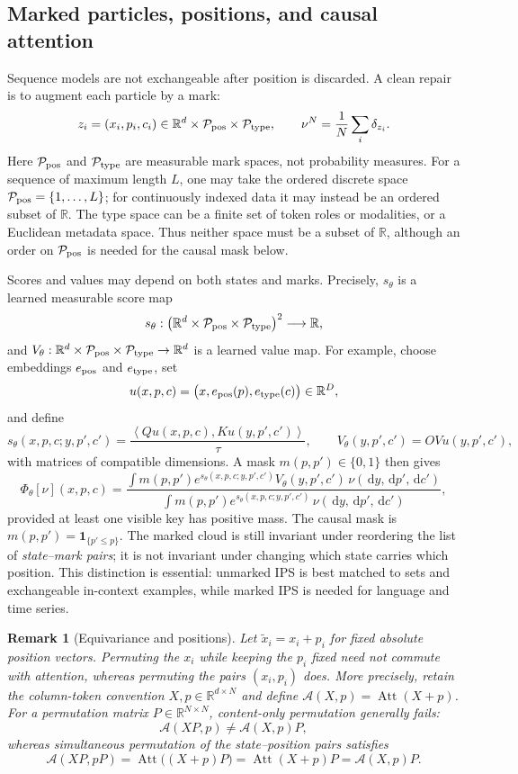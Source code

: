 \documentclass[11pt]{amsart}
\numberwithin{equation}{section}
\theoremstyle{plain}
\newtheorem{remark}[theorem]{Remark}
\newcommand{\R}{\mathbb{R}}
\newcommand{\dd}{\,\mathrm{d}}
\newcommand{\ip}[2]{\left\langle#1,#2\right\rangle}
\newcommand{\one}{\mathbf{1}}
\begin{document}
\subsection{Marked particles, positions, and causal attention}
Sequence models are not exchangeable after position is discarded.  A clean
repair is to augment each particle by a mark:
\[
  z_i=(x_i,p_i,c_i)\in
  \R^d\times\mathcal P_{\rm pos}\times\mathcal P_{\rm type},\qquad
  \nu^N=\frac1N\sum_i\delta_{z_i}.
\]
Here $\mathcal P_{\rm pos}$ and $\mathcal P_{\rm type}$ are measurable
mark spaces, not probability measures.  For a sequence of maximum length
$L$, one may take the ordered discrete space
$\mathcal P_{\rm pos}=\{1,\ldots,L\}$; for continuously indexed data it may
instead be an ordered subset of $\R$.  The type space can be a finite set of
token roles or modalities, or a Euclidean metadata space.  Thus neither space
must be a subset of $\R$, although an order on $\mathcal P_{\rm pos}$ is
needed for the causal mask below.

Scores and values may depend on both states and marks.
Precisely, $s_\theta$ is a learned measurable score map
\[
 s_\theta:
 \bigl(\R^d\times\mathcal P_{\rm pos}\times\mathcal P_{\rm type}\bigr)^2
 \longrightarrow\R,
\]
and
$V_\theta:\R^d\times\mathcal P_{\rm pos}\times\mathcal P_{\rm type}
\to\R^d$ is a learned value map.  For example, choose embeddings
$e_{\rm pos}$ and $e_{\rm type}$, set
\[
 u(x,p,c)=\bigl(x,e_{\rm pos}(p),e_{\rm type}(c)\bigr)\in\R^D,
\]
and define
\[
 s_\theta(x,p,c;y,p',c')
 =\frac{\ip{Qu(x,p,c)}{Ku(y,p',c')}}{\tau},
 \qquad
 V_\theta(y,p',c')=OVu(y,p',c'),
\]
with matrices of compatible dimensions.  A mask
$m(p,p')\in\{0,1\}$ then gives
\begin{equation}\label{eq:masked-field}
  \Phi_\theta[\nu](x,p,c)
  =\frac{\int m(p,p')e^{s_\theta(x,p,c;y,p',c')}
                   V_\theta(y,p',c')
     \,\nu(\dd y,\dd p',\dd c')}
    {\int m(p,p')e^{s_\theta(x,p,c;y,p',c')}
     \,\nu(\dd y,\dd p',\dd c')},
\end{equation}
provided at least one visible key has positive mass.  The causal mask is
$m(p,p')=\one_{\{p'\leq p\}}$.  The marked cloud is still invariant under
reordering the list of \emph{state--mark pairs}; it is not invariant under
changing which state carries which position.  This distinction is essential:
unmarked IPS is best matched to sets and exchangeable in-context examples,
while marked IPS is needed for language and time series.

\begin{remark}[Equivariance and positions]
Let $\widetilde x_i=x_i+p_i$ for fixed absolute position vectors.  Permuting
the $x_i$ while keeping the $p_i$ fixed need not commute with attention,
whereas permuting the pairs $(x_i,p_i)$ does.  More precisely, retain the
column-token convention $X,p\in\R^{d\times N}$ and define
$\mathcal A(X,p)=\operatorname{Att}(X+p)$.  For a permutation matrix
$P\in\R^{N\times N}$, content-only permutation generally fails:
\[
 \mathcal A(XP,p)\ne\mathcal A(X,p)P,
\]
whereas simultaneous permutation of the state--position pairs satisfies
\[
 \mathcal A(XP,pP)
 =\operatorname{Att}\bigl((X+p)P\bigr)
 =\operatorname{Att}(X+p)P
 =\mathcal A(X,p)P.
\]
\end{remark}
\end{document}
